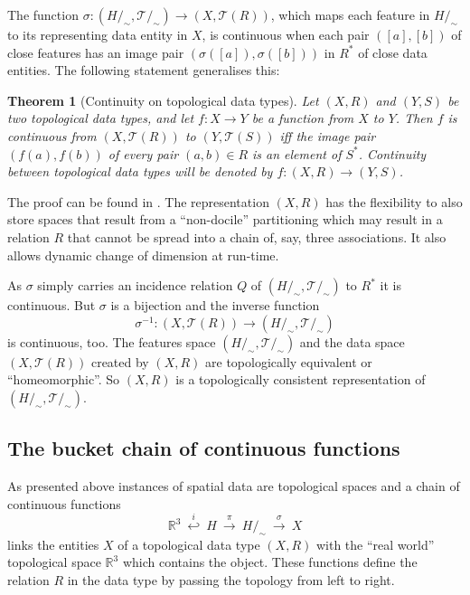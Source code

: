 \documentclass[5p]{elsarticle}
\newtheorem{theorem}{Theorem}
\newcommand{\qq}[1]{``#1''}
\begin{document}
The function $\sigma:(H/_{\!\sim},\mathcal{T}/_{\!\sim})\to(X,\mathcal{T}(R))$, which maps each 
feature in $H/_{\!\sim}$ to its representing data entity in $X$, is continuous when each pair 
$([a],[b])$ of close features has an image pair $(\sigma([a]),\sigma([b]))$ in $R^{*}$ of 
close data entities. The following statement generalises this:

\begin{sloppy} \begin{theorem}[Continuity on topological data types]
Let $(X,R)$ and $(Y,S)$ be two topological data types, and let ${f:X\to Y}$ be a function 
from $X$ to $Y$. Then $f$ is continuous from $(X,\mathcal{T}(R))$ to $(Y,\mathcal{T}(S))$ 
iff the image pair $(f(a),f(b))$ of every pair $(a,b)\in R$ is an element of 
$S^{*}$. 
Continuity between topological data types will be denoted by $f:(X,R)\to(Y,S)$.
\end{theorem}
\end{sloppy} 

The proof can be found in \cite[Thm.\ 5.6]{BradleyPaul}. 
The representation $(X,R)$ has the flexibility to also store spaces that result from a 
\qq{non-docile} partitioning which may result in a relation $R$ that cannot be spread into a 
chain of, say, three associations. It also allows dynamic change of dimension at run-time.

As $\sigma$ simply carries an incidence relation $Q$ of $(H/_{\!\sim},\mathcal{T}/_{\!\sim})$ to 
$R^{*}$ it is continuous. 
But $\sigma$ is a bijection and the inverse function 
$$
   \sigma^{-1}:(X,\mathcal{T}(R))\to(H/_{\!\sim},\mathcal{T}/_{\!\sim})
$$ 
is continuous, too. 
The features space $(H/_{\!\sim},\mathcal{T}/_{\!\sim})$ and the data space $(X,\mathcal{T}(R))$ 
created by $(X,R)$ are topologically 
equi\-valent or \qq{homeomorphic}. So $(X,R)$ is a topologically 
consistent representation of $(H/_{\!\sim},\mathcal{T}/_{\!\sim})$.


\subsection{The bucket chain of continuous functions}

As presented above instances of spatial data are topological spaces and a chain of continuous 
functions 
$$
  \mathbb{R}^3 \ \stackrel{i}{\hookleftarrow}\
             H \ \stackrel{\pi}{\longrightarrow}\ 
             H/_{\!\sim}\ \stackrel{\sigma}{\longrightarrow}\ X
$$
links the entities $X$ of a topological data type $(X,R)$ with the \qq{real world} topological 
space $\mathbb{R}^3$ which contains the object. These functions define the relation $R$ in the 
data type by passing the topology from left to right. 
\end{document}
